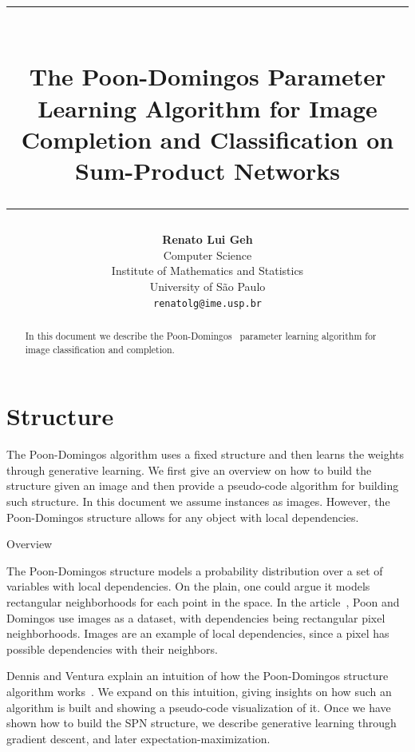 \documentclass{amsart}
\title{%
  \noindent\rule{13cm}{1.0pt}\\
  \vspace{0.2cm}
  The Poon-Domingos Parameter Learning Algorithm for Image Completion and Classification on
  Sum-Product Networks
  \noindent\rule{13cm}{0.8pt}
}
\author[]{\normalsize\textbf{Renato Lui Geh}\\\small Computer Science\\Institute of Mathematics
  and Statistics\\University of São Paulo\\\texttt{renatolg@ime.usp.br}}
\makeatletter
\def\subsection{\@startsection{subsection}{3}%
  \z@{.5\linespacing\@plus.7\linespacing}{.1\linespacing}%
  {\normalfont}}
\theoremstyle{plain}
\numberwithin{equation}{section}
\makeatother
\begin{document}
\begin{abstract}
  In this document we describe the Poon-Domingos~\cite{poon-domingos} parameter learning algorithm
  for image classification and completion.
  \vspace*{-3.5em}
\end{abstract}

\maketitle

\section{Structure}

The Poon-Domingos algorithm uses a fixed structure and then learns the weights through generative
learning. We first give an overview on how to build the structure given an image and then provide a
pseudo-code algorithm for building such structure. In this document we assume instances as images.
However, the Poon-Domingos structure allows for any object with local dependencies.

\subsection{Overview}

The Poon-Domingos structure models a probability distribution over a set of variables with local
dependencies. On the plain, one could argue it models rectangular neighborhoods for each point in
the space. In the article~\cite{poon-domingos}, Poon and Domingos use images as a dataset, with
dependencies being rectangular pixel neighborhoods. Images are an example of local dependencies,
since a pixel has possible dependencies with their neighbors.

Dennis and Ventura explain an intuition of how the Poon-Domingos structure algorithm
works~\cite{clustering}. We expand on this intuition, giving insights on how such an algorithm is
built and showing a pseudo-code visualization of it. Once we have shown how to build the SPN
structure, we describe generative learning through gradient descent, and later
expectation-maximization.
\end{document}
